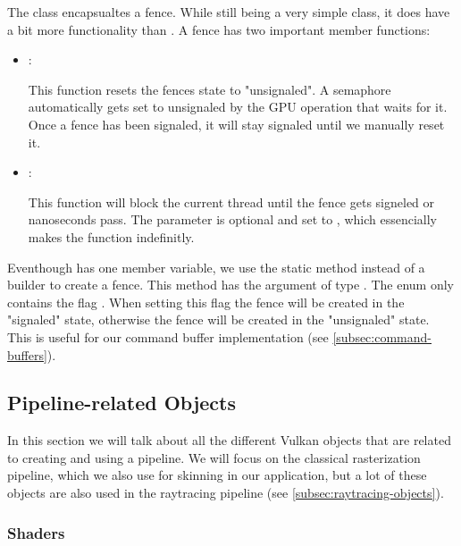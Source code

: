 The  class encapsualtes a fence. While still being a very simple class, it does have a bit more functionality than . A fence has two important member functions:

\begin{itemize}
    \item {}:
    
    This function resets the fences state to "unsignaled". A semaphore automatically gets set to unsignaled by the GPU operation that waits for it. Once a fence has been signaled, it will stay signaled until we manually reset it.

    \item {}:
    
    This function will block the current thread until the fence gets signeled or  nanoseconds pass. The  parameter is optional and set to , which essencially makes the function indefinitly.
\end{itemize}

Eventhough  has one member variable, we use the static method  instead of a builder to create a fence. This method has the argument of type . The  enum only contains the flag . When setting this flag the fence will be created in the "signaled" state, otherwise the fence will be created in the "unsignaled" state. This is useful for our command buffer implementation (see \autoref{subsec:command-buffers}).

\subsection{Pipeline-related Objects}\label{subsec:pipeline-objects}

In this section we will talk about all the different Vulkan objects that are related to creating and using a pipeline. We will focus on the classical rasterization pipeline, which we also use for skinning in our application, but a lot of these objects are also used in the raytracing pipeline (see \autoref{subsec:raytracing-objects}).

\subsubsection{Shaders}

